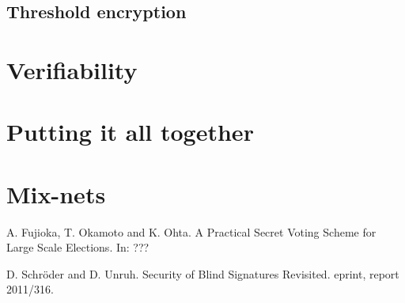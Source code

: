 \documentclass{llncs}
\begin{document}
\subsection{Threshold encryption}

\section{Verifiability}

\section{Putting it all together}

\section{Mix-nets}

\begin{thebibliography}{XXX11}
A. Fujioka, T. Okamoto and K. Ohta.
A Practical Secret Voting Scheme for Large Scale Elections.
In: ???

D. Schr\"oder and D. Unruh.
Security of Blind Signatures Revisited.
eprint, report 2011/316.

\end{thebibliography}
\end{document}
